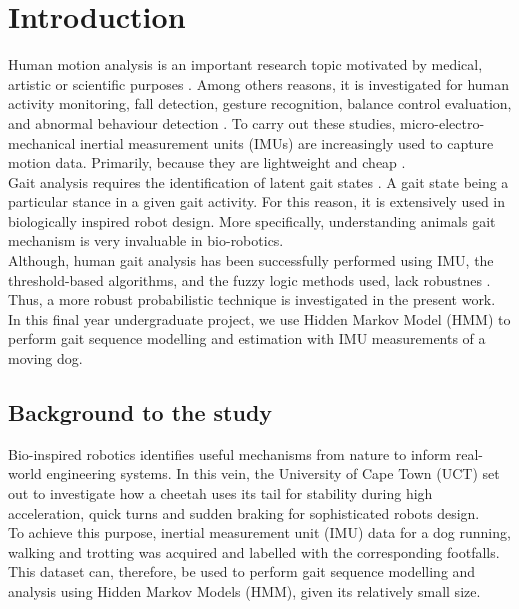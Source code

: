 \chapter{Introduction}

Human motion analysis is an important research topic motivated by medical, artistic or scientific purposes \cite{towa2009}. Among others reasons, it is investigated for human activity monitoring, fall detection, gesture recognition, balance control evaluation, and abnormal behaviour detection \cite{cont2013}. To carry out these studies, micro-electro-mechanical inertial measurement units (IMUs) are increasingly used to capture motion data. Primarily, because they are lightweight and cheap \cite{ches2012} \cite{towa2009} \cite{cont2013}.\\
Gait analysis requires the identification of latent gait states \cite{cont2013}. A gait state being a particular stance in a given gait activity.
For this reason, it is extensively used in biologically inspired robot design. More specifically, understanding animals gait mechanism is very invaluable in bio-robotics.\\
Although, human gait analysis has been successfully performed using IMU, the threshold-based algorithms, %
and the fuzzy logic methods %
used, lack robustnes \cite{cont2013}. Thus, a more robust probabilistic technique is investigated in the present work. In this final year undergraduate project, we use Hidden Markov Model (HMM) to perform gait sequence modelling and estimation with IMU measurements of a moving dog.


\section{Background to the study}
Bio-inspired robotics identifies useful mechanisms from nature to inform real-world engineering systems. In this vein, the University of Cape Town (UCT) set out to investigate how a cheetah uses its tail for stability during high acceleration, quick turns and sudden braking for sophisticated robots design. \\
To achieve this purpose, inertial measurement unit (IMU) data for a dog running, walking and trotting was acquired and labelled with the corresponding footfalls.\\
This dataset can, therefore, be used to perform gait sequence modelling and analysis using Hidden Markov Models (HMM), given its relatively small size. 	%

